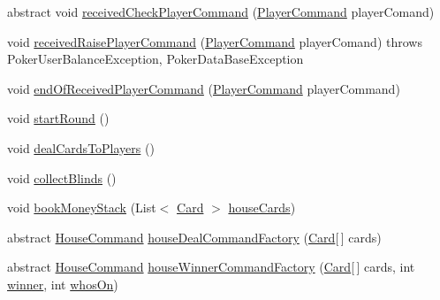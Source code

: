 \begin{DoxyCompactItemize}
\item 
abstract void \hyperlink{classhu_1_1elte_1_1bfw1p6_1_1poker_1_1server_1_1_abstract_poker_table_server_a66985cc2daba5f0719d0ddb21e6a3cf5}{received\+Check\+Player\+Command} (\hyperlink{classhu_1_1elte_1_1bfw1p6_1_1poker_1_1command_1_1_player_command}{Player\+Command} player\+Comand)
\item 
void \hyperlink{classhu_1_1elte_1_1bfw1p6_1_1poker_1_1server_1_1_abstract_poker_table_server_a8bf954935171ece66ced37f578483bcc}{received\+Raise\+Player\+Command} (\hyperlink{classhu_1_1elte_1_1bfw1p6_1_1poker_1_1command_1_1_player_command}{Player\+Command} player\+Comand)  throws Poker\+User\+Balance\+Exception, Poker\+Data\+Base\+Exception 
\item 
void \hyperlink{classhu_1_1elte_1_1bfw1p6_1_1poker_1_1server_1_1_abstract_poker_table_server_a7ad245c1f4fdd0a7d3fb65edc1ca24d5}{end\+Of\+Received\+Player\+Command} (\hyperlink{classhu_1_1elte_1_1bfw1p6_1_1poker_1_1command_1_1_player_command}{Player\+Command} player\+Command)
\item 
void \hyperlink{classhu_1_1elte_1_1bfw1p6_1_1poker_1_1server_1_1_abstract_poker_table_server_a876a0745fcb023a97177304e90234d7e}{start\+Round} ()
\item 
void \hyperlink{classhu_1_1elte_1_1bfw1p6_1_1poker_1_1server_1_1_abstract_poker_table_server_af667d45b51dad46a6a5d4ecea759d29c}{deal\+Cards\+To\+Players} ()
\item 
void \hyperlink{classhu_1_1elte_1_1bfw1p6_1_1poker_1_1server_1_1_abstract_poker_table_server_aabdf5390786e47418261dd54eb26c41e}{collect\+Blinds} ()
\item 
void \hyperlink{classhu_1_1elte_1_1bfw1p6_1_1poker_1_1server_1_1_abstract_poker_table_server_a6c98a78d75e1a2d7045fab52c980acf9}{book\+Money\+Stack} (List$<$ \hyperlink{classcom_1_1cantero_1_1games_1_1poker_1_1texasholdem_1_1_card}{Card} $>$ \hyperlink{classhu_1_1elte_1_1bfw1p6_1_1poker_1_1server_1_1_abstract_poker_table_server_a97fa87f3df41cc2ed5c4625ffdb41eb0}{house\+Cards})
\item 
abstract \hyperlink{classhu_1_1elte_1_1bfw1p6_1_1poker_1_1command_1_1_house_command}{House\+Command} \hyperlink{classhu_1_1elte_1_1bfw1p6_1_1poker_1_1server_1_1_abstract_poker_table_server_aab700a49759585112f5c59978a8fb985}{house\+Deal\+Command\+Factory} (\hyperlink{classcom_1_1cantero_1_1games_1_1poker_1_1texasholdem_1_1_card}{Card}\mbox{[}$\,$\mbox{]} cards)
\item 
abstract \hyperlink{classhu_1_1elte_1_1bfw1p6_1_1poker_1_1command_1_1_house_command}{House\+Command} \hyperlink{classhu_1_1elte_1_1bfw1p6_1_1poker_1_1server_1_1_abstract_poker_table_server_a29db18eb5ecbd28bdfc1d130a54ae228}{house\+Winner\+Command\+Factory} (\hyperlink{classcom_1_1cantero_1_1games_1_1poker_1_1texasholdem_1_1_card}{Card}\mbox{[}$\,$\mbox{]} cards, int \hyperlink{classhu_1_1elte_1_1bfw1p6_1_1poker_1_1server_1_1_abstract_poker_table_server_aeb7d19b10b768340a86884ce27cb2d92}{winner}, int \hyperlink{classhu_1_1elte_1_1bfw1p6_1_1poker_1_1server_1_1_abstract_poker_table_server_ac4b4b5f5ec9dfa6337b54008362895a9}{whos\+On})

\end{DoxyCompactItemize}
